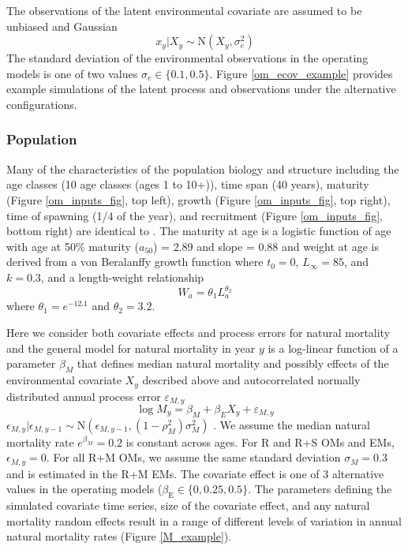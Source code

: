 \documentclass[
  12pt,
]{article}
\begin{document}
The observations of the latent environmental covariate are assumed to be unbiased and Gaussian
\[
x_y|X_y \sim \text{N}\left(X_y,\sigma^2_e\right)
\]
The standard deviation of the environmental observations in the operating models is one of two values \(\sigma_e \in \{0.1, 0.5\}\). Figure \ref{om_ecov_example} provides example simulations of the latent process and observations under the alternative configurations.

\hypertarget{population}{%
\subsubsection*{Population}\label{population}}

Many of the characteristics of the population biology and structure including the age classes (10 age classes (ages 1 to 10+)), time span (40 years), maturity (Figure \ref{om_inputs_fig}, top left), growth (Figure \ref{om_inputs_fig}, top right), time of spawning (1/4 of the year), and recruitment (Figure \ref{om_inputs_fig}, bottom right) are identical to \citet{milleretal_inreview1}. The maturity at age is a logistic function of age with age at 50\% maturity (\(a_{50}\)) = 2.89 and slope = 0.88 and weight at age is derived from a von Beralanffy growth function where \(t_0 = 0\), \(L_\infty = 85\), and \(k = 0.3\), and a length-weight relationship
\[
W_a = \theta_1 L_a^{\theta_2}
\]
where \(\theta_1 = e^{-12.1}\) and \(\theta_2 = 3.2\).

Here we consider both covariate effects and process errors for natural mortality and the general model for natural mortality in year \(y\) is a log-linear function of a parameter \(\beta_{M}\) that defines median natural mortality and possibly effects of the environmental covariate \(X_y\) described above and autocorrelated normally distributed annual process error \(\varepsilon_{M,y}\)
\[
\log M_y = \beta_M + \beta_{E} X_y + \varepsilon_{M,y}
\]
\(\epsilon_{M,y}|\epsilon_{M,y-1} \sim \text{N}\left(\epsilon_{M,y-1},(1-\rho_M^2)\sigma_M^2\right)\) \citep{stockmiller21}. We assume the median natural mortality rate \(e^{\beta_M} = 0.2\) is constant across ages. For R and R+S OMs and EMs, \(\epsilon_{M,y} = 0\). For all R+M OMs, we assume the same standard deviation \(\sigma_M = 0.3\) and is estimated in the R+M EMs. The covariate effect is one of 3 alternative values in the operating models (\(\beta_\text{E} \in \{0,0.25,0.5\}\). The parameters defining the simulated covariate time series, size of the covariate effect, and any natural mortality random effects result in a range of different levels of variation in annual natural mortality rates (Figure \ref{M_example}).
\end{document}

